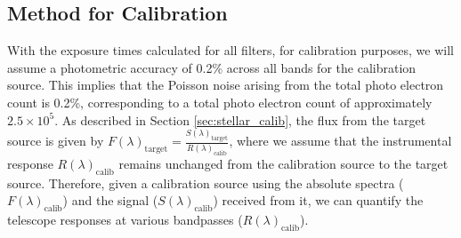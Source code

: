\begin{table}[ht!]
\centering
{}
    \caption{The exposure time required to obtain $2.5 \times 10^{5}$ photo-electrons to achieve 0.2\% photometric accuracy in each of the science filters for both Vega and Sirius A.}
\label{tab_2}
\end{table}

\subsection{Method for Calibration}\label{cal_meth}

With the exposure times calculated for all filters, for calibration purposes, we will assume a photometric accuracy of 0.2\% across all bands for the calibration source. This implies that the Poisson noise arising from the total photo electron count is 0.2\%, corresponding to a total photo electron count of approximately $2.5 \times 10^{5}$. As described in Section \ref{sec:stellar_calib}, the flux from the target source is given by $F(\lambda)_{\text{target}}=\frac{S(\lambda)_{\text{target}}}{R(\lambda)_{\text{calib}}}$, where we assume that the instrumental response $R(\lambda)_{\text{calib}}$ remains unchanged from the calibration source to the target source. Therefore, given a calibration source using the absolute spectra ($F(\lambda)_{\text{calib}}$) and the signal ($S(\lambda)_{\text{calib}}$) received from it, we can quantify the telescope responses at various bandpasses ($R(\lambda)_{\text{calib}}$).

